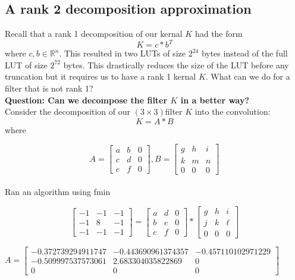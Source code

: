 \documentclass[12pt]{amsart}
\theoremstyle{definition}
\theoremstyle{remark}
\numberwithin{thm}{section}
\begin{document}
\subsection{A rank 2 decomposition approximation}
Recall that a rank 1 decomposition of our kernal $K$ had the form $$
K=c*b^T
$$
where $c,b \in \mathbb{R}^n$. This resulted in two LUTs of size $2^{24}$ bytes instead of the full LUT of size $2^{72}$ bytes. This drastically reduces the size of the LUT before any truncation but it requires us to have a rank 1 kernal $K$. What can we do for a filter that is not rank 1?
\\
\textbf{Question: Can we decompose the filter $K$   in a better way?}
\\
Consider the decomposition of our $(3\times 3)$filter $K$ into the convolution:
$$K=A*B$$
where 


$$
A
=
\begin{bmatrix}
a & b & 0\\
c & d & 0\\
e & f & 0
\end{bmatrix}
,
B=
\begin{bmatrix}
g & h & i\\
k & m & n\\
0 & 0 & 0
\end{bmatrix}$$
\\
Ran an algorithm using fmin

$$
\begin{bmatrix}
-1 & -1 & -1\\
-1 & 8 & -1\\
-1 & -1 & -1
\end{bmatrix}
=
\begin{bmatrix}
a & d & 0\\
b & e & 0\\
c & f & 0
\end{bmatrix} *
\begin{bmatrix}
g & h & i\\
j & k & \ell \\
0 & 0 & 0
\end{bmatrix}
$$

$
A =
\begin{bmatrix}
  -0.372739294911747  &-0.443690961374357 & -0.457110102971229\\
  -0.509997537573061  & 2.683304035822869 &                  0\\
                   0  &                 0 &                  0
\end{bmatrix}
$
\end{document}

